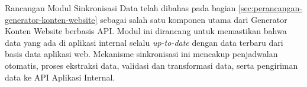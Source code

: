 Rancangan Modul Sinkronisasi Data telah dibahas pada bagian \ref{sec:perancangan-generator-konten-website} sebagai salah satu komponen utama dari Generator Konten Website berbasis API. Modul ini dirancang untuk memastikan bahwa data yang ada di aplikasi internal selalu \textit{up-to-date} dengan data terbaru dari basis data aplikasi web. Mekanisme sinkronisasi ini mencakup penjadwalan otomatis, proses ekstraksi data, validasi dan transformasi data, serta pengiriman data ke API Aplikasi Internal.
